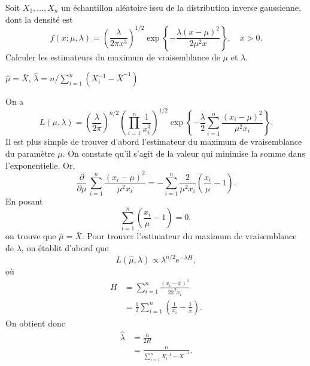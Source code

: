 \begin{exercice}
  Soit $X_1, \dots, X_n$ un échantillon aléatoire issu de la
  distribution inverse gaussienne, dont la densité est
  \begin{displaymath}
    f(x; \mu,\lambda) =
    \left(
      \frac{\lambda}{2\pi x^3}
    \right)^{1/2}
    \exp\left\{
      -\frac{\lambda (x - \mu)^2}{2\mu^2 x}
    \right\}, \quad x > 0.
  \end{displaymath}
  Calculer les estimateurs du maximum de vraisemblance de $\mu$ et $\lambda$.
  \begin{rep}
    $\hat{\mu} = \bar{X}$, $\hat{\lambda} = n/\sum_{i = 1}^n
    (X_i^{-1} - \bar{X}^{-1})$
  \end{rep}
  \begin{sol}
    On a
    \begin{equation*}
      L(\mu ,\lambda) =
      \left(
        \frac{\lambda}{2\pi}
      \right)^{n/2}
      \left(
        \prod_{i = 1}^n \frac{1}{x_i^3}
      \right)^{1/2}
      \exp\left\{
        -\frac{\lambda}{2}
        \sum_{i=1}^n \frac{(x_i - \mu)^2}{\mu^2 x_i}
      \right\}.
    \end{equation*}
    Il est plus simple de trouver d'abord l'estimateur du maximum de
    vraisemblance du paramètre $\mu$. On constate qu'il s'agit de la
    valeur qui minimise la somme dans l'exponentielle. Or,
    \begin{equation*}
      \frac{\partial}{\partial \mu}\,
      \sum_{i=1}^n \frac{(x_i - \mu)^2}{\mu^2 x_i} =
      -\sum_{i=1}^n \frac{2}{\mu^2 x_i}
      \left( \frac{x_i}{\mu} - 1 \right).
    \end{equation*}
    En posant
    \begin{equation*}
      \sum_{i=1}^n \left( \frac{x_i}{\mu} - 1 \right) = 0,
    \end{equation*}
    on trouve que $\hat{\mu} = \bar{X}$. Pour trouver l'estimateur du
    maximum de vraisemblance de $\lambda$, on établit d'abord que
    \begin{displaymath}
      L(\hat{\mu}, \lambda) \propto \lambda^{n/2} e^{-\lambda H},
    \end{displaymath}
    où
    \begin{align*}
      H &= \sum_{i = 1}^n \frac{(x_i - \bar{x})^2}{2 \bar{x}^2 x_i} \\
      &= \frac{1}{2} \sum_{i = 1}^n
      \left(
        \frac{1}{x_i} - \frac{1}{\bar{x}}
      \right).
    \end{align*}
    On obtient donc
    \begin{align*}
      \hat{\lambda} &= \frac{n}{2H}\\
      &= \frac{n}{\sum_{i = 1}^n X_i^{-1} - \bar{X}^{-1}}.
    \end{align*}
  \end{sol}
\end{exercice}

